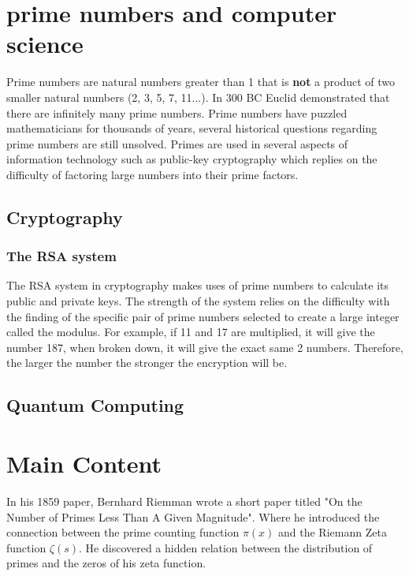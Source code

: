 \documentclass[12pt]{amsart} %
\theoremstyle{definition}
\theoremstyle{remark}
\numberwithin{equation}{section}
\begin{document}
\section{prime numbers and computer science}

Prime numbers are natural numbers greater than 1 that is \textbf{not} a product of two smaller natural numbers (2, 3, 5, 7, 11...). In 300 BC Euclid demonstrated that there are infinitely many prime numbers. Prime numbers have puzzled mathematicians for thousands of years, several historical questions regarding prime numbers are still unsolved. Primes are used in several aspects of information technology such as public-key cryptography which replies on the difficulty of factoring large numbers into their prime factors.
\subsection{Cryptography} 	
\subsubsection{The RSA system}
The RSA system in cryptography makes uses of prime numbers to calculate its public and private keys. The strength of the system relies on the difficulty with the finding of the specific pair of prime numbers selected to create a large integer called the modulus. For example, 
if 11 and 17 are multiplied, it will give the number 187, when broken down, it will give the exact same 2 numbers. Therefore, the larger the number the stronger the encryption will be.
\subsection{Quantum Computing}





\section{Main Content}
In his 1859 paper, Bernhard Riemman wrote a short paper titled "On the Number of Primes Less Than A Given Magnitude". Where he introduced the connection between the prime counting function $\pi(x) $ and the Riemann Zeta function $\zeta(s)$. He discovered a hidden relation between the distribution of primes and the zeros of his zeta function.
 
\end{document}
